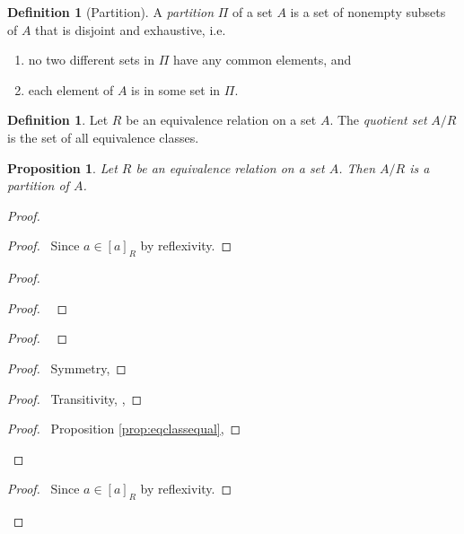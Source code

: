 \documentclass{book}
\let\qed\relax
\newtheorem{prop}[ax]{Proposition}
\theoremstyle{definition}
\newtheorem{df}[ax]{Definition}
\begin{document}
\begin{df}[Partition]
A \emph{partition} $\Pi$ of a set $A$ is a set of nonempty subsets of $A$ that is disjoint and exhaustive, i.e.
\begin{enumerate}
\item no two different sets in $\Pi$ have any common elements, and
\item each element of $A$ is in some set in $\Pi$.
\end{enumerate}
\end{df}

\begin{df}
Let $R$ be an equivalence relation on a set $A$. The \emph{quotient set} $A / R$ is the set of all equivalence classes.
\end{df}

\begin{prop}
Let $R$ be an equivalence relation on a set $A$. Then $A/R$ is a partition of $A$.
\end{prop}

\begin{proof}
\pf
{}
\begin{proof}
	\pf\ Since $a \in [a]_R$ by reflexivity.
\end{proof}
\begin{proof}
	\begin{proof}
		\pf\ 
	\end{proof}
	\begin{proof}
		\pf\ 
	\end{proof}
	\begin{proof}
		\pf\ Symmetry, 
	\end{proof}
	\begin{proof}
		\pf\ Transitivity, , 
	\end{proof}
	\begin{proof}
		\pf\ Proposition \ref{prop:eqclassequal}, 
	\end{proof}
\end{proof}
\begin{proof}
	\pf\ Since $a \in [a]_R$ by reflexivity.
\end{proof}
\qed
\end{proof}
\end{document}
